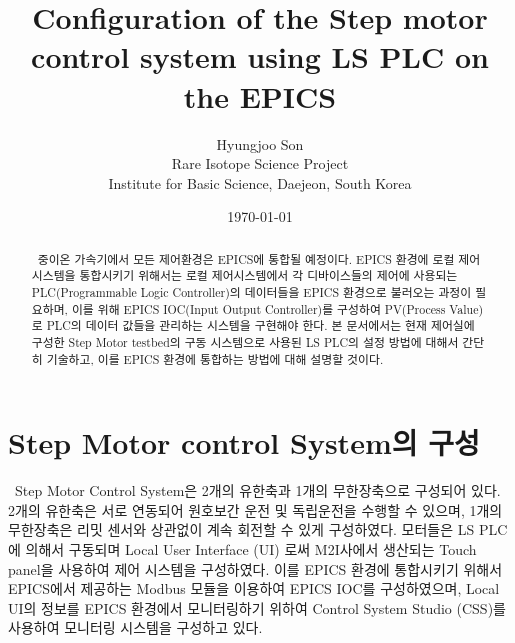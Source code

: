 \documentclass[11pt
  , a4paper
  , article
  , oneside
]{memoir}
\begin{document}
	
\newcommand{\technumber}{
  RAON Control-Document Series\\
  Revision : v1.0,   Release : February 5, 2016}
\title{\textbf{Configuration of the Step motor control system using LS PLC on the EPICS}}

\author{Hyungjoo Son \\

  Rare Isotope Science Project\\
  Institute for Basic Science, Daejeon, South Korea
}
\date{\today}

\renewcommand{\maketitlehooka}{\begin{flushright}\textsf{\technumber}\end{flushright}}

\maketitle

\begin{abstract}\
  중이온 가속기에서 모든 제어환경은 EPICS에 통합될 예정이다. EPICS 환경에 로컬 제어시스템을 통합시키기 위해서는 로컬 제어시스템에서 각 디바이스들의 제어에 사용되는 PLC(Programmable Logic Controller)의 데이터들을 EPICS 환경으로 불러오는 과정이 필요하며, 이를 위해 EPICS IOC(Input Output Controller)를 구성하여 PV(Process Value)로 PLC의 데이터 값들을 관리하는 시스템을 구현해야 한다. 
  본 문서에서는 현재 제어실에 구성한 Step Motor testbed의 구동 시스템으로 사용된 LS PLC의 설정 방법에 대해서 간단히 기술하고, 이를 EPICS 환경에 통합하는 방법에 대해 설명할 것이다. 
\end{abstract}

\chapter{Step Motor control System의 구성}\
Step Motor Control System은 2개의 유한축과 1개의 무한장축으로 구성되어 있다. 2개의 유한축은 서로 연동되어 원호보간 운전 및 독립운전을 수행할 수 있으며, 1개의 무한장축은 리밋 센서와 상관없이 계속 회전할 수 있게 구성하였다. 모터들은 LS PLC에 의해서 구동되며 Local User Interface (UI) 로써 M2I사에서 생산되는 Touch panel을 사용하여 제어 시스템을 구성하였다. 이를 EPICS 환경에 통합시키기 위해서 EPICS에서 제공하는 Modbus 모듈을 이용하여 EPICS IOC를 구성하였으며, Local UI의 정보를 EPICS 환경에서 모니터링하기 위하여 Control System Studio (CSS)를 사용하여 모니터링 시스템을 구성하고 있다.    
\end{document}
